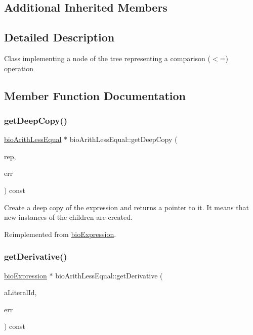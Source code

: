 \subsection*{Additional Inherited Members}


\subsection{Detailed Description}
Class implementing a node of the tree representing a comparison ($<$=) operation 

\subsection{Member Function Documentation}
\mbox{\label{classbio_arith_less_equal_a47bbe003d35d47d8ff6545a5cf8dd389}} 
\subsubsection{\texorpdfstring{get\+Deep\+Copy()}{getDeepCopy()}}
{\footnotesize\ttfamily \hyperlink{classbio_arith_less_equal}{bio\+Arith\+Less\+Equal} $\ast$ bio\+Arith\+Less\+Equal\+::get\+Deep\+Copy (\begin{DoxyParamCaption}\item[{\hyperlink{classbio_expression_repository}{bio\+Expression\+Repository} $\ast$}]{rep,  }\item[{pat\+Error $\ast$\&}]{err }\end{DoxyParamCaption}) const\hspace{0.3cm}{\ttfamily [virtual]}}

Create a deep copy of the expression and returns a pointer to it. It means that new instances of the children are created. 

Reimplemented from \hyperlink{classbio_expression_a4ee1b8add634078a02eaae26cd40dcc8}{bio\+Expression}.

\mbox{\label{classbio_arith_less_equal_aaaa08c34c10d1b89378dd0c67917239b}} 
\subsubsection{\texorpdfstring{get\+Derivative()}{getDerivative()}}
{\footnotesize\ttfamily \hyperlink{classbio_expression}{bio\+Expression} $\ast$ bio\+Arith\+Less\+Equal\+::get\+Derivative (\begin{DoxyParamCaption}\item[{pat\+U\+Long}]{a\+Literal\+Id,  }\item[{pat\+Error $\ast$\&}]{err }\end{DoxyParamCaption}) const\hspace{0.3cm}{\ttfamily [virtual]}}

